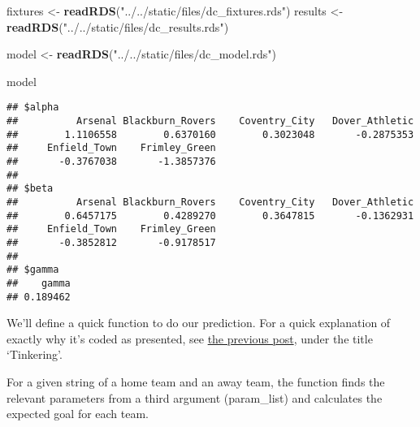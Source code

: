 \documentclass[
]{article}
\newenvironment{Shaded}{\begin{snugshade}}{\end{snugshade}}
\newcommand{\ControlFlowTok}[1]{\textcolor[rgb]{0.13,0.29,0.53}{\textbf{#1}}}
\newcommand{\DataTypeTok}[1]{\textcolor[rgb]{0.13,0.29,0.53}{#1}}
\newcommand{\KeywordTok}[1]{\textcolor[rgb]{0.13,0.29,0.53}{\textbf{#1}}}
\newcommand{\NormalTok}[1]{#1}
\newcommand{\OperatorTok}[1]{\textcolor[rgb]{0.81,0.36,0.00}{\textbf{#1}}}
\newcommand{\StringTok}[1]{\textcolor[rgb]{0.31,0.60,0.02}{#1}}
\begin{document}
\begin{Shaded}
\begin{Highlighting}[]
\NormalTok{fixtures <-}\StringTok{ }\KeywordTok{readRDS}\NormalTok{(}\StringTok{"../../static/files/dc_fixtures.rds"}\NormalTok{)}
\NormalTok{results <-}\StringTok{ }\KeywordTok{readRDS}\NormalTok{(}\StringTok{"../../static/files/dc_results.rds"}\NormalTok{)}

\NormalTok{model <-}\StringTok{ }\KeywordTok{readRDS}\NormalTok{(}\StringTok{"../../static/files/dc_model.rds"}\NormalTok{)}

\NormalTok{model}
\end{Highlighting}
\end{Shaded}

\begin{verbatim}
## $alpha
##          Arsenal Blackburn_Rovers    Coventry_City   Dover_Athletic 
##        1.1106558        0.6370160        0.3023048       -0.2875353 
##     Enfield_Town    Frimley_Green 
##       -0.3767038       -1.3857376 
## 
## $beta
##          Arsenal Blackburn_Rovers    Coventry_City   Dover_Athletic 
##        0.6457175        0.4289270        0.3647815       -0.1362931 
##     Enfield_Town    Frimley_Green 
##       -0.3852812       -0.9178517 
## 
## $gamma
##    gamma 
## 0.189462
\end{verbatim}

We'll define a quick function to do our prediction. For a quick
explanation of exactly why it's coded as presented, see
\href{https://www.robert-hickman.eu/post/dixon_coles_1/\#Tinkering}{the
previous post}, under the title `Tinkering'.

For a given string of a home team and an away team, the function finds
the relevant parameters from a third argument (param\_list) and
calculates the expected goal for each team.

\begin{Shaded}
\end{Shaded}
\end{document}
